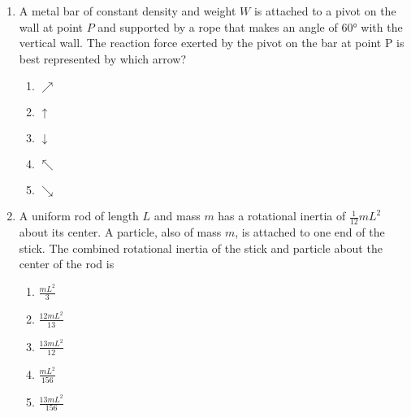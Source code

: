 \documentclass{../../../oss-apphys}
\begin{document}
\begin{multicols}{2}
\begin{enumerate}[leftmargin=18pt]
  \item A metal bar of constant density and weight $W$ is attached to a pivot on
    the wall at point $P$ and supported by a rope that makes an angle of
    \ang{60} with the vertical wall. The reaction force exerted by the pivot on
    the bar at point P is best represented by which arrow?
    \begin{center}
    \end{center}
    \begin{enumerate}[noitemsep,topsep=0pt,leftmargin=18pt,label=(\Alph*)]
    \item\vspace{-.15in} $\nearrow$
    \item $\uparrow$
    \item $\downarrow$
    \item $\nwarrow$
    \item $\searrow$
    \end{enumerate}

  \item A uniform rod of length $L$ and mass $m$ has a rotational inertia of
    $\displaystyle \frac1{12}mL^2$ about its center. A particle, also of mass
    $m$, is attached to one end of the stick. The combined rotational inertia of
    the stick and particle about the center of the rod is
    \begin{center}
    \end{center}
    \begin{enumerate}[noitemsep,topsep=0pt,leftmargin=18pt,label=(\Alph*)]
    \item$\displaystyle\frac{mL^2}{3}$
    \item$\displaystyle\frac{12mL^2}{13}$
    \item$\displaystyle\frac{13mL^2}{12}$
    \item$\displaystyle\frac{mL^2}{156}$
    \item$\displaystyle\frac{13mL^2}{156}$
    \end{enumerate}
%    
    

\end{enumerate}
\end{multicols}
\end{document}
